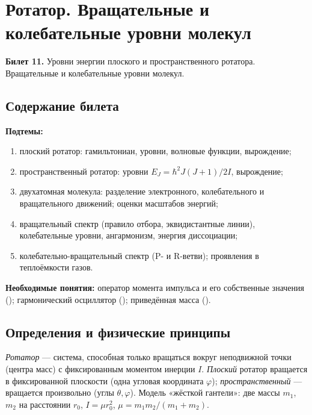 \chapter[Ротатор. Вращательные и колебательные уровни молекул]%
        {Ротатор. Вращательные и колебательные уровни молекул}
\label{t:11}

\begin{qbox}
\textbf{Билет 11.} Уровни энергии плоского и пространственного ротатора. Вращательные и
колебательные уровни молекул.
\end{qbox}

\section{Содержание билета}

\textbf{Подтемы:}
\begin{enumerate}
 \item плоский ротатор: гамильтониан, уровни, волновые функции, вырождение;
 \item пространственный ротатор: уровни $E_J=\hbar^2J(J+1)/2I$, вырождение;
 \item двухатомная молекула: разделение электронного, колебательного и вращательного движений; оценки масштабов энергий;
 \item вращательный спектр (правило отбора, эквидистантные линии), колебательные уровни, ангармонизм, энергия диссоциации;
 \item колебательно-вращательный спектр (P- и R-ветви); проявления в теплоёмкости газов.
\end{enumerate}

\textbf{Необходимые понятия:} оператор момента импульса и его собственные значения
(); гармонический осциллятор (); приведённая масса ().

\section{Определения и физические принципы}

\begin{definition}[ротатор]
\emph{Ротатор} — система, способная только вращаться вокруг неподвижной точки (центра масс) с
фиксированным моментом инерции $I$. \emph{Плоский} ротатор вращается в фиксированной плоскости
(одна угловая координата $\varphi$); \emph{пространственный} — вращается произвольно (углы $\theta,\varphi$).
Модель «жёсткой гантели»: две массы $m_1$, $m_2$ на расстоянии $r_0$, $I=\mu r_0^2$, $\mu=m_1m_2/(m_1+m_2)$.
\end{definition}

